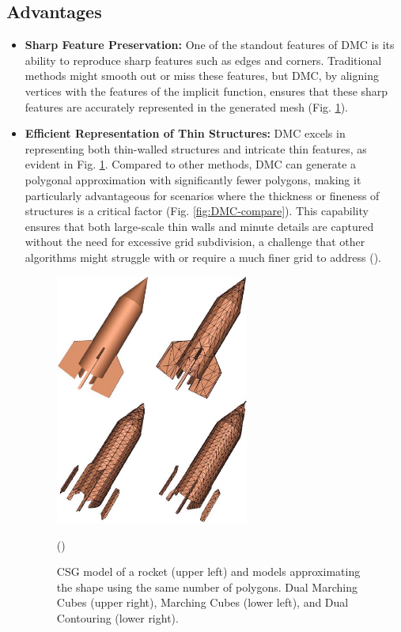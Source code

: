 \subsection{Advantages}
\begin{itemize}
\item \textbf{Sharp Feature Preservation:} One of the standout features of DMC is its ability to reproduce sharp features such as edges and corners. Traditional methods might smooth out or miss these features, but DMC, by aligning vertices with the features of the implicit function, ensures that these sharp features are accurately represented in the generated mesh (Fig. \ref{fig:DMC}).

\item \textbf{Efficient Representation of Thin Structures:} DMC excels in representing both thin-walled structures and intricate thin features, as evident in Fig. \ref{fig:DMC}. Compared to other methods, DMC can generate a polygonal approximation with significantly fewer polygons, making it particularly advantageous for scenarios where the thickness or fineness of structures is a critical factor (Fig. \ref{fig:DMC-compare}). This capability ensures that both large-scale thin walls and minute details are captured without the need for excessive grid subdivision, a challenge that other algorithms might struggle with or require a much finer grid to address (\cite{Schaefer_2004}).

\begin{figure}
\centering
\includegraphics[height=0.6\textwidth, width=0.6\textwidth]{Figures/DMC.jpg}
\decoRule
\caption{CSG model of a rocket (upper left) and models approximating the shape using the same number of polygons. Dual Marching Cubes (upper right), Marching Cubes (lower left), and Dual Contouring (lower right).}(\cite{Schaefer_2004})
\label{fig:DMC}
\end{figure}


\end{itemize}
